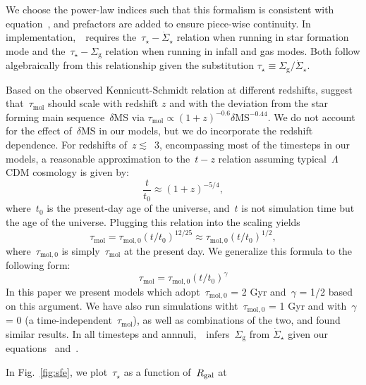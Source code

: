 \documentclass[draft2.tex]{subfiles}
\begin{document}
We choose the power-law indices such that this formalism is consistent 
with equation~, and prefactors are added to ensure 
piece-wise continuity. 
In implementation,~\vice~requires the~$\tau_\star-\dot{\Sigma}_\star$ relation 
when running in star formation mode and the~$\tau_\star-\Sigma_\text{g}$ 
relation when running in infall and gas modes. 
Both follow algebraically from this relationship given the substitution 
$\tau_\star \equiv \Sigma_\text{g} / \dot{\Sigma}_\star$. 
\par 
Based on the observed Kennicutt-Schmidt relation at different redshifts, 
\citet{Tacconi2018} suggest that~$\tau_\text{mol}$ should scale with redshift 
$z$ and with the deviation from the star forming main sequence~$\delta$MS via 
$\tau_\text{mol} \propto (1 + z)^{-0.6}\delta\text{MS}^{-0.44}$. 
We do not account for the effect of~$\delta$MS in our models, but we do 
incorporate the redshift dependence. 
For redshifts of~$z \lesssim$~3, encompassing most of the timesteps in 
our models, a reasonable approximation to the~$t - z$ relation assuming 
typical~$\Lambda$CDM cosmology is given by: 
\begin{equation} 
\frac{t}{t_0} \approx (1 + z)^{-5/4}, 
\end{equation} 
where~$t_0$ is the present-day age of the universe, and~$t$ is not simulation 
time but the age of the universe. Plugging this relation into the 
\citet{Tacconi2018} scaling yields 
\begin{equation} 
\tau_\text{mol} = \tau_{\text{mol},0}(t/t_0)^{12/25} \approx 
\tau_{\text{mol},0}(t/t_0)^{1/2}, 
\end{equation} 
where~$\tau_{\text{mol},0}$ is simply~$\tau_\text{mol}$ at the present day. We 
generalize this formula to the following form: 
\begin{equation} 
\tau_\text{mol} = \tau_{\text{mol},0}(t/t_0)^\gamma 
\label{eq:tau_mol}
\end{equation} 
In this paper we present models which adopt~$\tau_{\text{mol},0}$ = 2 Gyr 
\citep{Leroy2008, Leroy2013, Tacconi2018} and~$\gamma$ = 1/2 based on this 
argument. 
We have also run simulations witht~$\tau_{\text{mol},0}$ = 1 
Gyr and with~$\gamma$ = 0 (a time-independent~$\tau_\text{mol}$), as well as 
combinations of the two, and found similar results. 
In all timesteps and annnuli,~\vice~infers~$\Sigma_\text{g}$ from 
$\dot{\Sigma}_\star$ given our equations~ and~. 
\par
In Fig.~\ref{fig:sfe}, we plot~$\tau_\star$ as a function of~$R_\text{gal}$ at 
\end{document}

